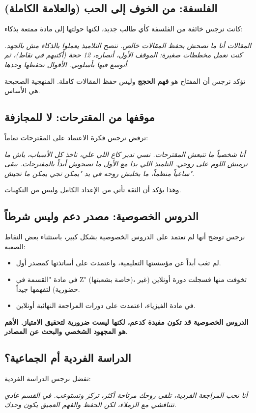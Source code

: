 \documentclass[12pt,a4paper]{book}
\newcommand{\quoteAr}[1]{%
	\begin{myquote}
		\itshape #1
	\end{myquote}
}
\newcommand{\importantAr}[1]{%
	\begin{important}
		\bfseries #1
	\end{important}
}
\begin{document}
	\subsection{الفلسفة: من الخوف إلى الحب (والعلامة الكاملة)}
	كانت نرجس خائفة من الفلسفة كأي طالب جديد، لكنها حولتها إلى مادة ممتعة بذكاء:
	\quoteAr{المقالات أنا ما نصحش بحفظ المقالات خالص. ننصح التلاميذ يعملوا بالذكاء مش بالجهد. كنت نعمل مخططات صغيرة: الموقف الأول، أنصاره، 12 حجة (أكتبهم في نقاط)، ثم أتوسع فيها بأسلوبي. الأقوال تحفظها وحدها.}
	تؤكد نرجس أن المفتاح هو \textbf{فهم الحجج} وليس حفظ المقالات كاملة. المنهجية الصحيحة هي الأساس.
	
	\subsection{موقفها من المقترحات: لا للمجازفة}
			\label{sec:philo-proposals-post2}
	ترفض نرجس فكرة الاعتماد على المقترحات تماماً:
	\quoteAr{أنا شخصياً ما نتبعش المقترحات. نسي ندير كاع اللي علي، ناخذ كل الأسباب، باش ما نرميش اللوم على روحي. التلميذ اللي بدا مع الأول ما نصحوش أبداً بالمقترحات. يبقى ساعياً منظماً، ما يخليش روحه في يد "يمكن تجي يمكن ما تجيش".}
	وهذا يؤكد أن الثقة تأتي من الإعداد الكامل وليس من التكهنات.
	
	\subsection{الدروس الخصوصية: مصدر دعم وليس شرطاً}
	نرجس توضح أنها لم تعتمد على الدروس الخصوصية بشكل كبير، باستثناء بعض النقاط الصعبة:
	\begin{itemize}
		\item لم تغب أبداً عن مؤسستها التعليمية، واعتمدت على أساتذتها كمصدر أول.
		\item في مادة "القسمة في Z" (خاصة بشعبتها)، تخوفت منها فسجلت دورة أونلاين (غير حضورية) لتفهمها جيداً.
		\item في مادة الفيزياء، اعتمدت على دورات المراجعة النهائية أونلاين.
	\end{itemize}
	\importantAr{الدروس الخصوصية قد تكون مفيدة كدعم، لكنها ليست ضرورية لتحقيق الامتياز. الأهم هو المجهود الشخصي والبحث عن المصادر.}
	
	\subsection{الدراسة الفردية أم الجماعية؟}
	تفضل نرجس الدراسة الفردية:
	\quoteAr{أنا نحب المراجعة الفردية، تلقى روحك مرتاحة أكثر، تركز وتستوعب. في القسم عادي تتناقشي مع الزملاء، لكن الحفظ والفهم العميق يكون وحدك.}
	
\end{document}
